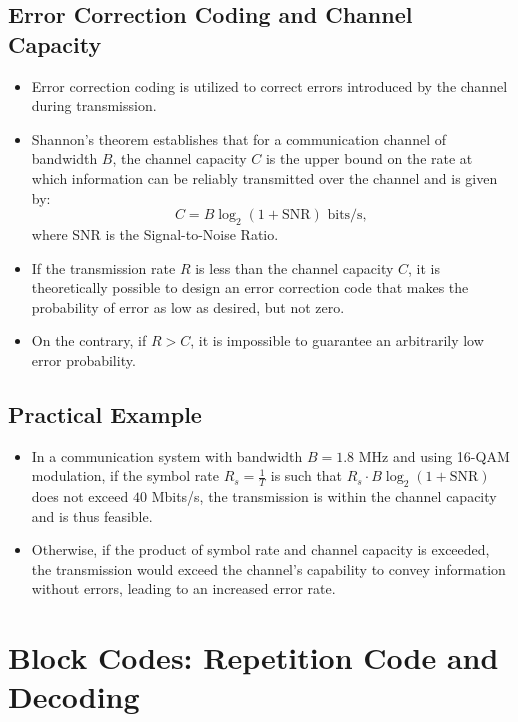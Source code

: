 \subsection*{Error Correction Coding and Channel Capacity}
\begin{itemize}
    \item Error correction coding is utilized to correct errors introduced by the channel during transmission.
    \item Shannon's theorem establishes that for a communication channel of bandwidth \( B \), the channel capacity \( C \) is the upper bound on the rate at which information can be reliably transmitted over the channel and is given by:
    \[ C = B \log_2 (1 + \text{SNR}) \text{ bits/s}, \]
    where SNR is the Signal-to-Noise Ratio.
    \item If the transmission rate \( R \) is less than the channel capacity \( C \), it is theoretically possible to design an error correction code that makes the probability of error as low as desired, but not zero.
    \item On the contrary, if \( R > C \), it is impossible to guarantee an arbitrarily low error probability.
\end{itemize}

\subsection*{Practical Example}
\begin{itemize}
    \item In a communication system with bandwidth \( B = 1.8 \) MHz and using 16-QAM modulation, if the symbol rate \( R_s = \frac{1}{T} \) is such that \( R_s \cdot B \log_2(1 + \text{SNR}) \) does not exceed \( 40 \) Mbits/s, the transmission is within the channel capacity and is thus feasible.
    \item Otherwise, if the product of symbol rate and channel capacity is exceeded, the transmission would exceed the channel's capability to convey information without errors, leading to an increased error rate.
\end{itemize}






\section*{Block Codes: Repetition Code and Decoding}

